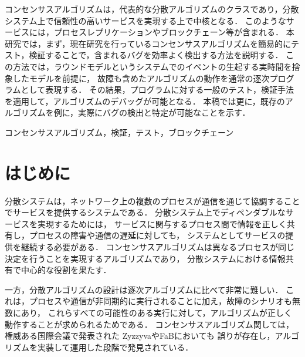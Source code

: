 \documentclass[technicalreport]{ieicej}
\def\IEICEJcls{\texttt{ieicej.cls}}
\def\IEICEJver{3.1}
\theoremstyle{plain}
\begin{document}
\begin{jabstract}
    コンセンサスアルゴリズムは，代表的な分散アルゴリズムのクラスであり，分散システム上で信頼性の高いサービスを実現する上で中核となる．
    このようなサービスには，プロセスレプリケーションやブロックチェーン等が含まれる．
    本研究では，まず，現在研究を行っているコンセンサスアルゴリズムを簡易的にテスト，検証することで，含まれるバグを効率よく検出する方法を説明する．
    この方法では，ラウンドモデルというシステムでのイベントの生起する実時間を捨象したモデルを前提に，
    故障も含めたアルゴリズムの動作を通常の逐次プログラムとして表現する．
    その結果，プログラムに対する一般のテスト，検証手法を適用して，アルゴリズムのデバッグが可能となる．
    本稿では更に，既存のアルゴリズムを例に，実際にバグの検出と特定が可能なことを示す．
\end{jabstract}
\begin{jkeyword}
	コンセンサスアルゴリズム，検証，テスト，ブロックチェーン
\end{jkeyword}
\maketitle

\section{はじめに}


分散システムは，ネットワーク上の複数のプロセスが通信を通じて協調することでサービスを提供するシステムである．
分散システム上でディペンダブルなサービスを実現するためには，
サービスに関与するプロセス間で情報を正しく共有し，プロセスの障害や通信の遅延に対しても，
システムとしてサービスの提供を継続する必要がある．
コンセンサスアルゴリズムは異なるプロセスが同じ決定を行うことを実現するアルゴリズムであり，
分散システムにおける情報共有で中心的な役割を果たす．

一方，分散アルゴリズムの設計は逐次アルゴリズムに比べて非常に難しい．
これは，プロセスや通信が非同期的に実行されることに加え，故障のシナリオも無数にあり，
これらすべての可能性のある実行に対して，アルゴリズムが正しく動作することが求められるためである．
コンセンサスアルゴリズム関しては，権威ある国際会議で発表された
Zyzzyva\cite{KotlaADCW09}やFaB\cite{MartinA05}においても
誤りが存在し，アルゴリズムを実装して運用した段階で発見されている\cite{Abraham2017}．
\end{document}
